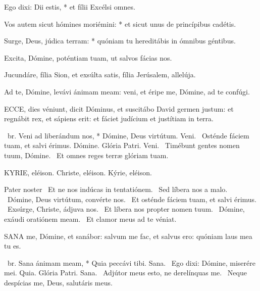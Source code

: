 Ego dixi: Dii estis, * et fílii Excélsi omnes.

Vos autem sicut hómines moriémini: * et sicut unus de princípibus cadétis.

Surge, Deus, júdica terram: * quóniam tu hereditábis in ómnibus géntibus.

  Excita, Dómine, poténtiam tuam, ut salvos fácias nos.


  Jucundáre, fília Sion, et exsúlta satis, fília Jerúsalem, allelúja.

  Ad te, Dómine, levávi ánimam meam: veni, et éripe me, Dómine, ad te confúgi.


\lettrine[lines=2]{E}{CCE}, dies véniunt, dicit Dóminus, et suscitábo David germen justum: et regnábit rex, et sápiens erit: et fáciet judícium et justítiam in terra.

\R\ br. Veni ad liberándum nos, * Dómine, Deus virtútum. Veni. \V\ Osténde fáciem tuam, et salvi érimus. Dómine. Glória Patri. Veni. \V\ Timébunt gentes nomen tuum, Dómine. \R\ Et omnes reges terræ glóriam tuam.

\label{feria6:precesferialester}

KYRIE, eléison. Christe, eléison. Kýrie, eléison.

Pater noster  \V\ Et ne nos indúcas in tentatiónem. \R\ Sed líbera nos a malo. \V\ Dómine, Deus virtútum, convérte nos. \R\ Et osténde fáciem tuam, et salvi érimus. \V\ Exsúrge, Christe, ádjuva nos. \R\ Et líbera nos propter nomen tuum. \V\ Dómine, exáudi oratiónem meam. \R\ Et clamor meus ad te véniat.




\lettrine[lines=2]{S}{ANA} me, Dómine, et sanábor: salvum me fac, et salvus ero: quóniam laus mea tu es.

\R\ br. Sana ánimam meam, * Quia peccávi tibi. Sana. \V\ Ego dixi: Dómine, miserére mei. Quia. Glória Patri. Sana. \V\ Adjútor meus esto, ne derelínquas me. \R\ Neque despícias me, Deus, salutáris meus.


